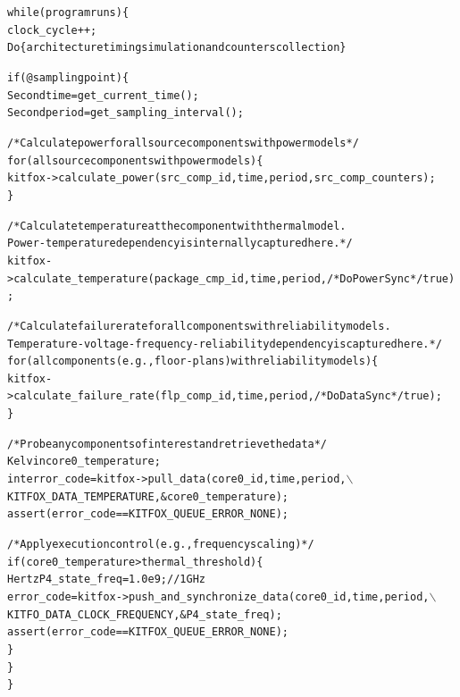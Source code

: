 {
\fontsize{10pt}{11pt}\selectfont
\begin{alltt}
while (program runs) \{
    clock_cycle++;
    Do \{architecture timing simulation and counters collection\}
    
    if (@sampling point) \{
        Second time = get_current_time();
        Second period = get_sampling_interval();
        
        /* Calculate power for all source components with power models */
        for (all source components with power models) \{
            kitfox->calculate_power(src_comp_id, time, period, src_comp_counters);
        \}
        
        /* Calculate temperature at the component with thermal model. 
        Power-temperature dependency is internally captured here. */
        kitfox->calculate_temperature(package_cmp_id, time, period, /*DoPowerSync*/true);
        
        /* Calculate failure rate for all components with reliability models. 
        Temperature-voltage-frequency-reliability dependency is captured here. */
        for (all components (e.g., floor-plans) with reliability models) \{
            kitfox->calculate_failure_rate(flp_comp_id, time, period, /*DoDataSync*/true);
        \}
        
        /* Probe any components of interest and retrieve the data */
        Kelvin core0_temperature;
        int error_code = kitfox->pull_data(core0_id, time, period,\(\backslash\)
                         KITFOX_DATA_TEMPERATURE, &core0_temperature);
        assert(error_code == KITFOX_QUEUE_ERROR_NONE);
        
        /* Apply execution control (e.g., frequency scaling) */
        if(core0_temperature > thermal_threshold) \{
            Hertz P4_state_freq = 1.0e9; // 1GHz
            error_code = kitfox->push_and_synchronize_data(core0_id, time, period,\(\backslash\)
                         KITFO_DATA_CLOCK_FREQUENCY, &P4_state_freq);
            assert(error_code == KITFOX_QUEUE_ERROR_NONE);
        \}
    \}
\}
\end{alltt}
}
 
